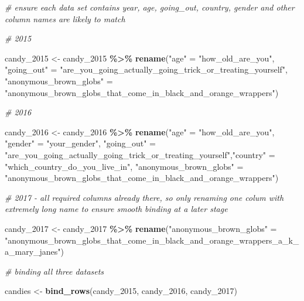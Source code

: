 \documentclass[
]{article}
\newenvironment{Shaded}{\begin{snugshade}}{\end{snugshade}}
\newcommand{\CommentTok}[1]{\textcolor[rgb]{0.56,0.35,0.01}{\textit{#1}}}
\newcommand{\FunctionTok}[1]{\textcolor[rgb]{0.13,0.29,0.53}{\textbf{#1}}}
\newcommand{\NormalTok}[1]{#1}
\newcommand{\OtherTok}[1]{\textcolor[rgb]{0.56,0.35,0.01}{#1}}
\newcommand{\SpecialCharTok}[1]{\textcolor[rgb]{0.81,0.36,0.00}{\textbf{#1}}}
\newcommand{\StringTok}[1]{\textcolor[rgb]{0.31,0.60,0.02}{#1}}
\begin{document}
\begin{Shaded}
\begin{Highlighting}[]
\CommentTok{\# ensure each data set contains year, age, going\_out, country, gender and other column names are likely to match}

\CommentTok{\# 2015}

\NormalTok{candy\_2015 }\OtherTok{\textless{}{-}}\NormalTok{ candy\_2015 }\SpecialCharTok{\%\textgreater{}\%} 
  \FunctionTok{rename}\NormalTok{(}\StringTok{"age"} \OtherTok{=} \StringTok{"how\_old\_are\_you"}\NormalTok{,}
         \StringTok{"going\_out"} \OtherTok{=} \StringTok{"are\_you\_going\_actually\_going\_trick\_or\_treating\_yourself"}\NormalTok{,}
         \StringTok{"anonymous\_brown\_globs"} \OtherTok{=}
           \StringTok{"anonymous\_brown\_globs\_that\_come\_in\_black\_and\_orange\_wrappers"}\NormalTok{)}
         

\CommentTok{\# 2016}

\NormalTok{candy\_2016 }\OtherTok{\textless{}{-}}\NormalTok{ candy\_2016 }\SpecialCharTok{\%\textgreater{}\%} 
  \FunctionTok{rename}\NormalTok{(}\StringTok{"age"} \OtherTok{=} \StringTok{"how\_old\_are\_you"}\NormalTok{,}
         \StringTok{"gender"} \OtherTok{=} \StringTok{"your\_gender"}\NormalTok{,}
         \StringTok{"going\_out"} \OtherTok{=} \StringTok{"are\_you\_going\_actually\_going\_trick\_or\_treating\_yourself"}\NormalTok{,}\StringTok{"country"} \OtherTok{=} \StringTok{"which\_country\_do\_you\_live\_in"}\NormalTok{,}
         \StringTok{"anonymous\_brown\_globs"} \OtherTok{=}
           \StringTok{"anonymous\_brown\_globs\_that\_come\_in\_black\_and\_orange\_wrappers"}\NormalTok{)}

\CommentTok{\# 2017 {-} all required columns already there, so only renaming one colum with extremely long name to ensure smooth binding at a later stage}

\NormalTok{candy\_2017 }\OtherTok{\textless{}{-}}\NormalTok{ candy\_2017 }\SpecialCharTok{\%\textgreater{}\%} 
  \FunctionTok{rename}\NormalTok{(}\StringTok{"anonymous\_brown\_globs"} \OtherTok{=}
  \StringTok{"anonymous\_brown\_globs\_that\_come\_in\_black\_and\_orange\_wrappers\_a\_k\_a\_mary\_janes"}\NormalTok{)}


\CommentTok{\# binding all three datasets}


\NormalTok{candies }\OtherTok{\textless{}{-}} \FunctionTok{bind\_rows}\NormalTok{(candy\_2015, candy\_2016, candy\_2017)}
\end{Highlighting}
\end{Shaded}
\end{document}
